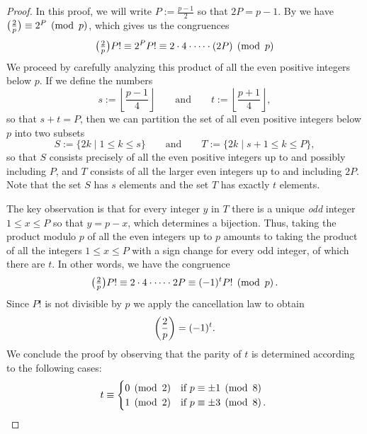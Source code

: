 \begin{proof}
  In this proof, we will write $P:=\frac{p-1}{2}$ so that $2P=p-1$. By  we have $\legendre{2}{p}\equiv 2^P\pmod{p}$, which gives us the congruences
  \begin{equation*}
    {\textstyle \legendre{2}{p}P!}\equiv 2^{P}P! \equiv 2\cdot 4 \cdot \cdots \cdot (2P) \pmod{p}
  \end{equation*}
  We proceed by carefully analyzing this product of all the even positive integers below $p$. If we define the numbers
  \begin{equation*}
    s:=\left\lfloor\frac{p-1}{4}\right\rfloor\qquad\text{and}\qquad t:=\left\lfloor\frac{p+1}{4}\right\rfloor,
  \end{equation*}
  so that $s+t=P$, then we can partition the set of all even positive integers below $p$ into two subsets
  \begin{equation*}
    S:=\{2k\mid 1\leq k \leq s\}\qquad\text{and}\qquad T:=\{2k\mid s+1\leq k\leq P\},
  \end{equation*}
  so that $S$ consists precisely of all the even positive integers up to and possibly including $P$, and $T$ consists of all the larger even integers up to and including $2P$. Note that the set $S$ has $s$ elements and the set $T$ has exactly $t$ elements.

  The key observation is that for every integer $y$ in $T$ there is a unique \emph{odd} integer $1\leq x\leq P$ so that $y=p-x$, which determines a bijection. Thus, taking the product modulo $p$ of all the even integers up to $p$ amounts to taking the product of all the integers $1\leq x\leq P$ with a sign change for every odd integer, of which there are $t$. In other words, we have the congruence
  \begin{equation*}
    {\textstyle \legendre{2}{p}P!}\equiv 2\cdot 4\cdot\cdots\cdot 2P\equiv (-1)^{t} P!\pmod{p}.
  \end{equation*}
  Since $P!$ is not divisible by $p$ we apply the cancellation law to obtain
  \begin{equation*}
    \legendre{2}{p}=(-1)^{t}.
  \end{equation*}
  We conclude the proof by observing that the parity of $t$ is determined according to the following cases:
  \begin{equation*}
    t\equiv
    \begin{cases}
      0\pmod{2} & \text{if }p\equiv \pm 1\pmod{8} \\
      1\pmod{2} & \text{if }p\equiv \pm 3\pmod{8}. \\
    \end{cases}
    \qedhere
  \end{equation*}
\end{proof}

